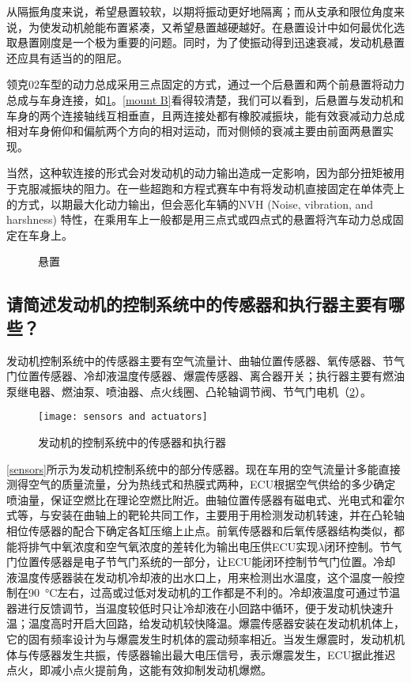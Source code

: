 \documentclass[UTF8]{ctexart}
\numberwithin{figure}{section}
\numberwithin{table}{section}
\begin{document}
从隔振角度来说，希望悬置较软，以期将振动更好地隔离；而从支承和限位角度来说，为使发动机舱能布置紧凑，又希望悬置越硬越好。在悬置设计中如何最优化选取悬置刚度是一个极为重要的问题。同时，为了使振动得到迅速衰减，发动机悬置还应具有适当的的阻尼。

领克02车型的动力总成采用三点固定的方式，通过一个后悬置和两个前悬置将动力总成与车身连接，如\cref{mount}。\cref{mount B}看得较清楚，我们可以看到，后悬置与发动机和车身的两个连接轴线互相垂直，且两连接处都有橡胶减振块，能有效衰减动力总成相对车身俯仰和偏航两个方向的相对运动，而对侧倾的衰减主要由前面两悬置实现。

当然，这种软连接的形式会对发动机的动力输出造成一定影响，因为部分扭矩被用于克服减振块的阻力。在一些超跑和方程式赛车中有将发动机直接固定在单体壳上的方式，以期最大化动力输出，但会恶化车辆的NVH (Noise, vibration, and harshness) 特性，在乘用车上一般都是用三点式或四点式的悬置将汽车动力总成固定在车身上。

\begin{figure}[htbp]
	\centering
	\caption{悬置}
	\label{mount}
\end{figure}

\subsection{请简述发动机的控制系统中的传感器和执行器主要有哪些？}

发动机控制系统中的传感器主要有空气流量计、曲轴位置传感器、氧传感器、节气门位置传感器、冷却液温度传感器、爆震传感器、离合器开关；执行器主要有燃油泵继电器、燃油泵、喷油器、点火线圈、凸轮轴调节阀、节气门电机（\cref{sensors and actuators}）。

\begin{figure}[htbp]
	\centering
	\texttt{[image: sensors and actuators]}
	\caption{发动机的控制系统中的传感器和执行器}
	\label{sensors and actuators}
\end{figure}

\cref{sensors}所示为发动机控制系统中的部分传感器。现在车用的空气流量计多能直接测得空气的质量流量，分为热线式和热膜式两种，ECU根据空气供给的多少确定喷油量，保证空燃比在理论空燃比附近。曲轴位置传感器有磁电式、光电式和霍尔式等，与安装在曲轴上的靶轮共同工作，主要用于用检测发动机转速，并在凸轮轴相位传感器的配合下确定各缸压缩上止点。前氧传感器和后氧传感器结构类似，都能将排气中氧浓度和空气氧浓度的差转化为输出电压供ECU实现$\lambda$闭环控制。节气门位置传感器是电子节气门系统的一部分，让ECU能闭环控制节气门位置。冷却液温度传感器装在发动机冷却液的出水口上，用来检测出水温度，这个温度一般控制在\SI{90}{\celsius}左右，过高或过低对发动机的工作都是不利的。冷却液温度可通过节温器进行反馈调节，当温度较低时只让冷却液在小回路中循环，便于发动机快速升温；温度高时开启大回路，给发动机较快降温。爆震传感器安装在发动机机体上，它的固有频率设计为与爆震发生时机体的震动频率相近。当发生爆震时，发动机机体与传感器发生共振，传感器输出最大电压信号，表示爆震发生，ECU据此推迟点火，即减小点火提前角，这能有效抑制发动机爆燃。
\end{document}
